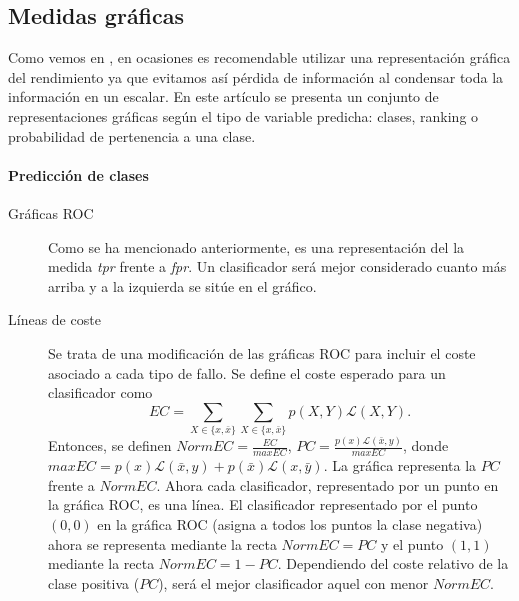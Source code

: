 \subsection*{Medidas gráficas}

	Como vemos en \cite{PRATI11}, en ocasiones es recomendable utilizar una representación gráfica del rendimiento ya que evitamos así pérdida de información al condensar toda la información en un escalar. En este artículo se presenta un conjunto de representaciones gráficas según el tipo de variable predicha: clases, ranking o probabilidad de pertenencia a una clase.
	
\paragraph{Predicción de clases}
	\begin{description}
		\item[Gráficas ROC] Como se ha mencionado anteriormente, es una representación del la medida \textit{tpr} frente a \textit{fpr}. Un clasificador será mejor considerado cuanto más arriba y a la izquierda se sitúe en el gráfico. 
		\item[Líneas de coste] Se trata de una modificación de las gráficas ROC para incluir el coste asociado a cada tipo de fallo. Se define el coste esperado para un clasificador como 
		\[ EC = \sum\limits_{X \in \{x, \bar{x}\}} 
		 		\sum\limits_{X \in \{x, \bar{x}\}} 
		 			p(X,Y) \mathcal{L}(X,Y)			.\]
	Entonces, se definen $NormEC = \frac{EC}{maxEC}$, $PC = \frac{p(x) \mathcal{L}(\bar{x},y)}{maxEC}$, donde $maxEC = p(x)\mathcal{L}(\bar{x},y)+p(\bar{x})\mathcal{L}(x,\bar{y})$.  La gráfica representa la $PC$ frente a $NormEC$. Ahora cada clasificador, representado por un punto en la gráfica ROC, es una línea. El clasificador representado por el punto $(0,0)$ en la gráfica ROC (asigna a todos los puntos la clase negativa) ahora se representa mediante la recta $NormEC=PC$ y el punto $(1,1)$ mediante la recta $NormEC= 1-PC$. Dependiendo del coste relativo de la clase positiva ($PC$), será el mejor clasificador aquel con menor $NormEC$.
	\end{description}

